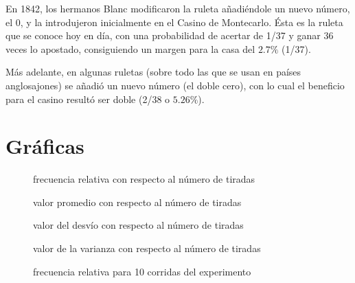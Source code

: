 \documentclass{article}
\begin{document}
En 1842, los hermanos Blanc modificaron la ruleta añadiéndole un nuevo número, el 0, y la introdujeron inicialmente en el Casino de Montecarlo. Ésta es la ruleta que se conoce hoy en día, con una probabilidad de acertar de 1/37 y ganar 36 veces lo apostado, consiguiendo un margen para la casa del $2.7\%$ (1/37).

Más adelante, en algunas ruletas (sobre todo las que se usan en países anglosajones) se añadió un nuevo número (el doble cero), con lo cual el beneficio para el casino resultó ser doble (2/38 o $5.26\%$).

\section{Gráficas}
\begin{figure}[!htbp]
  \begin{mytikzresize}{0.8\textwidth}
    \centering
    
    \caption{frecuencia relativa con respecto al número de tiradas}
  \end{mytikzresize}
\end{figure}

\begin{figure}[!htbp]
  \begin{mytikzresize}{0.8\textwidth}
    \centering
    
    \caption{valor promedio con respecto al número de tiradas}
  \end{mytikzresize}
\end{figure}

\begin{figure}[!htbp]
  \begin{mytikzresize}{0.8\textwidth}
    \centering
    
    \caption{valor del desvío con respecto al número de tiradas}
  \end{mytikzresize}
\end{figure}

\begin{figure}[!htbp]
  \begin{mytikzresize}{0.8\textwidth}
    \centering
    
    \caption{valor de la varianza con respecto al número de tiradas}
  \end{mytikzresize}
\end{figure}

\begin{figure}[!htbp]
  \begin{mytikzresize}{0.8\textwidth}
    \centering
    
    \caption{frecuencia relativa para 10 corridas del experimento}
  \end{mytikzresize}
\end{figure}
\end{document}
